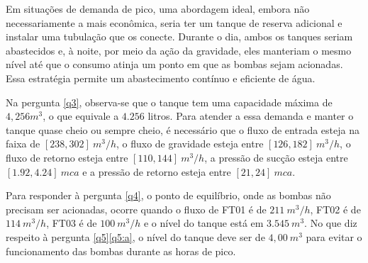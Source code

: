 Em situações de demanda de pico, uma abordagem ideal, embora não necessariamente a mais econômica, seria ter um tanque de reserva adicional e instalar uma tubulação que os conecte. Durante o dia, ambos os tanques seriam abastecidos e, à noite, por meio da ação da gravidade, eles manteriam o mesmo nível até que o consumo atinja um ponto em que as bombas sejam acionadas. Essa estratégia permite um abastecimento contínuo e eficiente de água.


Na pergunta \ref{q3}, observa-se que o tanque tem uma capacidade máxima de $4,256 m^3$, o que equivale a $4.256$ litros. Para atender a essa demanda e manter o tanque quase cheio ou sempre cheio, é necessário que o fluxo de entrada esteja na faixa de $[238, 302] \ m^3/h$, o fluxo de gravidade esteja entre $[126, 182] \ m^3/h$, o fluxo de retorno esteja entre $[110, 144] \ m^3/h$, a pressão de sucção esteja entre $[1.92, 4.24] \ mca$ e a pressão de retorno esteja entre $[21, 24] \ mca$.

Para responder à pergunta \ref{q4}, o ponto de equilíbrio, onde as bombas não precisam ser acionadas, ocorre quando o fluxo de FT01 é de $211 \ m^3/h$, FT02 é de $114 \ m^3/h$, FT03 é de $100 \ m^3/h$ e o nível do tanque está em $3.545 \ m^3$.
No que diz respeito à pergunta \ref{q5}\ref{q5:a}, o nível do tanque deve ser de $4,00 \ m^3$ para evitar o funcionamento das bombas durante as horas de pico.